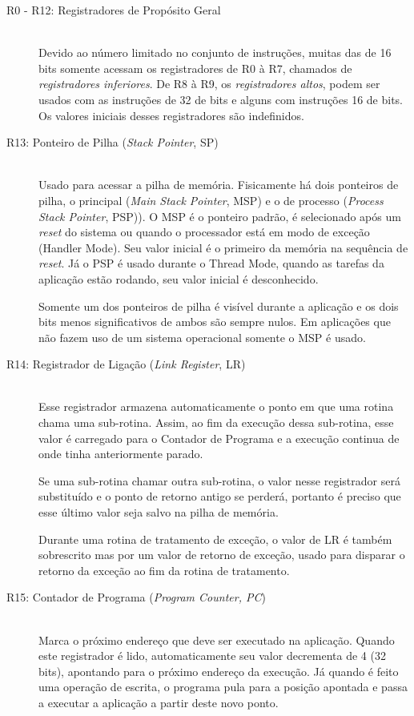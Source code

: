 \begin{description}
\item[R0 - R12: Registradores de Propósito Geral]\hfill \\
Devido ao número limitado no conjunto de instruções, muitas das de 16 bits somente acessam os registradores de R0 à R7, chamados de \emph{registradores inferiores}. De R8 à R9, os \emph{registradores altos}, podem ser usados com as instruções de 32 de bits e alguns com instruções 16 de bits. Os valores iniciais desses registradores são indefinidos.

\item[R13: Ponteiro de Pilha (\emph{Stack Pointer}, SP)]\hfill \\
Usado para acessar a pilha de memória. Fisicamente há dois ponteiros de pilha, o principal (\emph{Main Stack Pointer}, MSP) e o de processo (\emph{Process Stack Pointer}, PSP)). O MSP é o ponteiro padrão, é selecionado após um \emph{reset} do sistema ou quando o processador está em modo de exceção (Handler Mode). Seu valor inicial é o primeiro da memória na sequência de \emph{reset}. Já o PSP é usado durante o Thread Mode, quando as tarefas da aplicação estão rodando, seu valor inicial é desconhecido.

Somente um dos ponteiros de pilha é visível durante a aplicação e os dois bits menos significativos de ambos são sempre nulos. Em aplicações que não fazem uso de um sistema operacional somente o MSP é usado.

\item[R14: Registrador de Ligação (\emph{Link Register}, LR)]\hfill \\
Esse registrador armazena automaticamente o ponto em que uma rotina chama uma sub-rotina. Assim, ao fim da execução dessa sub-rotina, esse valor é carregado para o Contador de Programa e a execução continua de onde tinha anteriormente parado.

Se uma sub-rotina chamar outra sub-rotina, o valor nesse registrador será substituído e o ponto de retorno antigo se perderá, portanto é preciso que esse último valor seja salvo na pilha de memória.

Durante uma rotina de tratamento de exceção, o valor de LR é também sobrescrito mas por um valor de retorno de exceção, usado para disparar o retorno da exceção ao fim da rotina de tratamento.

\item[R15: Contador de Programa (\emph{Program Counter, PC})]\hfill \\
Marca o próximo endereço que deve ser executado na aplicação. Quando este registrador é lido, automaticamente seu valor decrementa de 4 (32 bits), apontando para o próximo endereço da execução. Já quando é feito uma operação de escrita, o programa pula para a posição apontada e passa a executar a aplicação a partir deste novo ponto.


\end{description}
